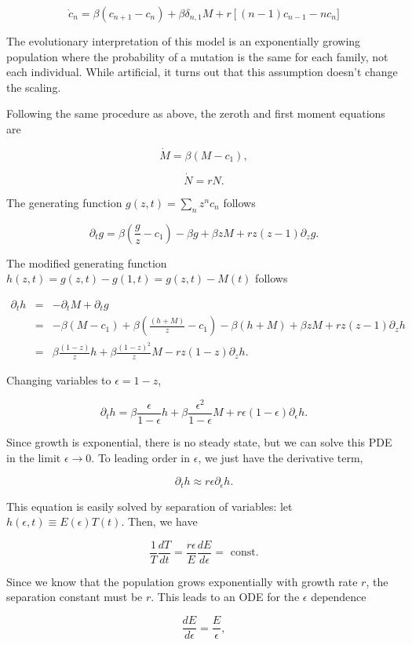 \documentclass[12pt]{article}
\def\be{\begin{equation}}
\def\ee{\end{equation}}
\def\bea{\begin{eqnarray}}
\def\eea{\end{eqnarray}}
\begin{document}
\be
\dot{c}_n = \beta(c_{n+1}- c_n) + \beta\delta_{n,1}M +r\left[(n-1)c_{n-1} - nc_n]\right. 
\ee

\noindent The evolutionary interpretation of this model is an exponentially growing population where the probability of a mutation is the same for each family, not each individual. While artificial, it turns out that this assumption doesn't change the scaling.

Following the same procedure as above, the zeroth and first moment equations are

\be
\dot{M} = \beta(M-c_1),
\ee

\be
\dot{N} = rN.
\ee

The generating function $g(z,t) = \sum_n z^nc_n$ follows

\be
\partial_t g = \beta\left(\frac{g}{z} - c_1\right) - \beta g + \beta zM +rz(z-1)\partial_zg.
\ee

The modified generating function $h(z,t) = g(z,t) - g(1,t) = g(z,t) - M(t)$ follows

\bea
\partial_t h 	&=& - \partial_t M + \partial_t g \nonumber\\
			&=&  -\beta(M-c_1) + \beta\left(\frac{(h+M)}{z} - c_1\right) - \beta(h+M) + \beta zM +rz(z-1)\partial_zh\nonumber\\
		&=& \beta \frac{(1-z)}{z}h + \beta\frac{(1-z)^2}{z}M - rz(1-z)\partial_zh.
\eea

Changing variables to $\epsilon = 1-z$,

\be
\partial_t h = \beta \frac{\epsilon}{1-\epsilon}h + \beta\frac{\epsilon^2}{1-\epsilon}M + r\epsilon(1-\epsilon)\partial_{\epsilon}h.
\ee

\noindent Since growth is exponential, there is no steady state, but we can solve this PDE in the limit $\epsilon \to 0$. To leading order in $\epsilon$, we just have the derivative term,

\be
\partial_t h \approx r\epsilon\partial_{\epsilon}h.
\ee

This equation is easily solved by separation of variables: let $h(\epsilon,t) \equiv E(\epsilon)T(t)$. Then, we have

\be
\frac{1}{T}\frac{dT}{dt} = \frac{r\epsilon}{E}\frac{dE}{d\epsilon} = \text{ const.}
\ee

\noindent Since we know that the population grows exponentially with growth rate $r$, the separation constant must be $r$. This leads to an ODE for the $\epsilon$ dependence

\be
\frac{dE}{d\epsilon} = \frac{E}{\epsilon},
\ee
\end{document}
